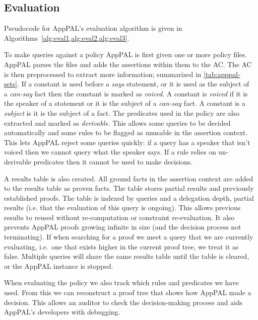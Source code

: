 \documentclass[thesis.tex]{subfiles}
\begin{document}
\subsection{Evaluation}
\label{ssec:evaluation-alg}

Pseudocode for AppPAL's evaluation algorithm is given in Algorithms~\cref{alg:eval1,alg:eval2,alg:eval3}.

To make queries against a policy AppPAL is first given one or more policy files.
AppPAL parses the files and adds the assertions within them to the \ac{AC}.
The AC is then preprocessed to extract more information; summarized in \autoref{tab:apppal-sets}.
If a constant is used before a \emph{says} statement, or it is used as the subject of a \emph{can-say} fact then the constant is marked as \emph{voiced}.
A constant is \emph{voiced} if it is the speaker of a statement or it is the subject of a \emph{can-say} fact.
A constant is a \emph{subject} is it is the subject of a fact.
The predicates used in the policy are also extracted and marked as \emph{derivable}.
This allows some queries to be decided automatically and some rules to be flagged as unusable in the assertion context.
This lets AppPAL reject some queries quickly: if a query has a speaker that isn't voiced then we cannot query what the speaker says.
If a rule relies on un-derivable predicates then it cannot be used to make decisions.

A results table is also created.
All ground facts in the assertion context are added to the results table as proven facts.
The table stores partial results and previously established proofs.
The table is indexed by queries and a delegation depth, partial results (i.e. that the evaluation of this query is ongoing).
This allows previous results to reused without re-computation or constraint re-evaluation.
It also prevents AppPAL proofs growing infinite in size (and the decision process not terminating).
If when searching for a proof we meet a query that we are currently evaluating, i.e.~one that exists higher in the current proof tree, we treat it as false.
Multiple queries will share the same results table until the table is cleared, or the AppPAL instance is stopped.

When evaluating the policy we also track which rules and predicates we have used.
From this we can reconstruct a proof tree that shows how AppPAL made a decision.
This allows an auditor to check the decision-making process and aids AppPAL's developers with debugging.
\end{document}
